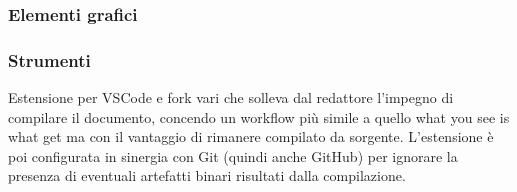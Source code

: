 

\subsubsection{Elementi grafici}



\subsubsection{Strumenti}

    

    Estensione per VSCode e fork vari che solleva dal redattore l'impegno di compilare il documento, concendo un workflow più simile
    a quello what you see is what get ma con il vantaggio di rimanere compilato da sorgente.
    L'estensione è poi configurata in sinergia con Git (quindi anche GitHub) per ignorare la presenza di eventuali artefatti binari
    risultati dalla compilazione.

